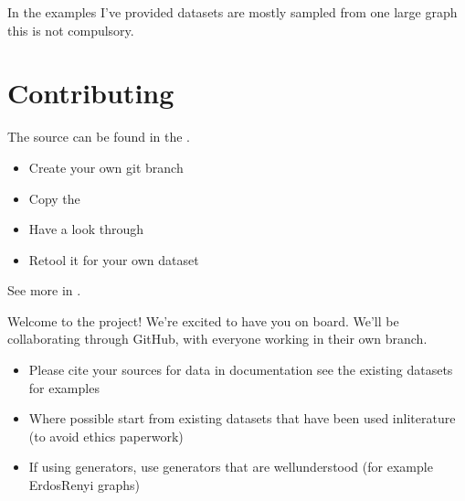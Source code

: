 \documentclass[letterpaper,10pt,english]{sphinxhowto}
\begin{document}
\sphinxAtStartPar
In the examples I’ve provided datasets are mostly sampled from one large graph \sphinxhyphen{} this is not compulsory.


\section{Contributing}
\label{\detokenize{index:contributing}}
\sphinxAtStartPar
The source can be found in the .
\begin{description}
\begin{itemize}
\item {} 
\sphinxAtStartPar
Create your own git branch

\item {} 
\sphinxAtStartPar
Copy the 

\item {} 
\sphinxAtStartPar
Have a look through

\item {} 
\sphinxAtStartPar
Re\sphinxhyphen{}tool it for your own dataset

\end{itemize}

\sphinxAtStartPar
See more in {\hyperref[\detokenize{get-started:get-started}]{}}.

\sphinxstepscope
{}\label{\detokenize{get-started:get-started}}
\sphinxAtStartPar
Welcome to the project! We’re excited to have you on board.
We’ll be collaborating through GitHub, with everyone working in their own branch.
\begin{description}
\begin{itemize}
\item {} 
\sphinxAtStartPar
Please cite your sources for data in documentation \sphinxhyphen{} see the existing datasets for examples

\item {} 
\sphinxAtStartPar
Where possible start from existing datasets that have been used in\sphinxhyphen{}literature (to avoid ethics paperwork)

\item {} 
\sphinxAtStartPar
If using generators, use generators that are well\sphinxhyphen{}understood (for example Erdos\sphinxhyphen{}Renyi graphs)


\end{itemize}
\end{description}
\end{description}
\end{document}
